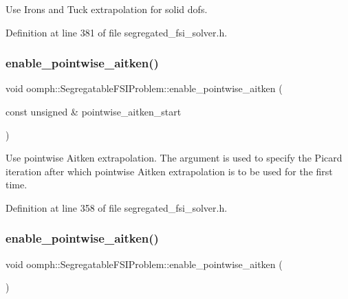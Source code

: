 Use Irons and Tuck extrapolation for solid dofs. 



Definition at line 381 of file segregated\+\_\+fsi\+\_\+solver.\+h.

\mbox{\label{classoomph_1_1SegregatableFSIProblem_a08c87f24c9e3ea80182a4b19d3a9fa92}} 
\subsubsection{\texorpdfstring{enable\+\_\+pointwise\+\_\+aitken()}{enable\_pointwise\_aitken()}\hspace{0.1cm}{\footnotesize\ttfamily [1/2]}}
{\footnotesize\ttfamily void oomph\+::\+Segregatable\+F\+S\+I\+Problem\+::enable\+\_\+pointwise\+\_\+aitken (\begin{DoxyParamCaption}\item[{const unsigned \&}]{pointwise\+\_\+aitken\+\_\+start }\end{DoxyParamCaption})\hspace{0.3cm}{\ttfamily [inline]}}



Use pointwise Aitken extrapolation. The argument is used to specify the Picard iteration after which pointwise Aitken extrapolation is to be used for the first time. 



Definition at line 358 of file segregated\+\_\+fsi\+\_\+solver.\+h.

\mbox{\label{classoomph_1_1SegregatableFSIProblem_a3f52d9c6555b43d8ada274ec80940c13}} 
\subsubsection{\texorpdfstring{enable\+\_\+pointwise\+\_\+aitken()}{enable\_pointwise\_aitken()}\hspace{0.1cm}{\footnotesize\ttfamily [2/2]}}
{\footnotesize\ttfamily void oomph\+::\+Segregatable\+F\+S\+I\+Problem\+::enable\+\_\+pointwise\+\_\+aitken (\begin{DoxyParamCaption}{ }\end{DoxyParamCaption})\hspace{0.3cm}{\ttfamily [inline]}}



